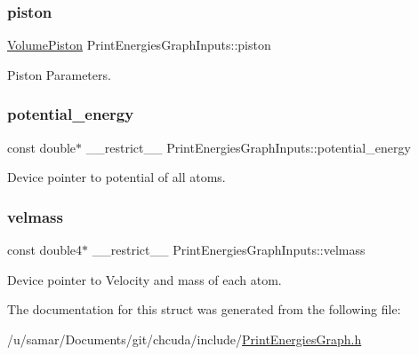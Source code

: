 \hypertarget{structPrintEnergiesGraphInputs_a37b64e2334e0ee6481ecb96081417f2a}{}\label{structPrintEnergiesGraphInputs_a37b64e2334e0ee6481ecb96081417f2a} 
\subsubsection{\texorpdfstring{piston}{piston}}
{\footnotesize\ttfamily \hyperlink{structVolumePiston}{Volume\+Piston} Print\+Energies\+Graph\+Inputs\+::piston}



Piston Parameters. 

\hypertarget{structPrintEnergiesGraphInputs_a6faa1be5d040282aca80b029942ab2eb}{}\label{structPrintEnergiesGraphInputs_a6faa1be5d040282aca80b029942ab2eb} 
\subsubsection{\texorpdfstring{potential\+\_\+energy}{potential\_energy}}
{\footnotesize\ttfamily const double$\ast$ \+\_\+\+\_\+restrict\+\_\+\+\_\+ Print\+Energies\+Graph\+Inputs\+::potential\+\_\+energy}



Device pointer to potential of all atoms. 

\hypertarget{structPrintEnergiesGraphInputs_adc38d3e47b0b4ab22dfb7b0253ccefff}{}\label{structPrintEnergiesGraphInputs_adc38d3e47b0b4ab22dfb7b0253ccefff} 
\subsubsection{\texorpdfstring{velmass}{velmass}}
{\footnotesize\ttfamily const double4$\ast$ \+\_\+\+\_\+restrict\+\_\+\+\_\+ Print\+Energies\+Graph\+Inputs\+::velmass}



Device pointer to Velocity and mass of each atom. 



The documentation for this struct was generated from the following file\+:\begin{DoxyCompactItemize}
\item 
/u/samar/\+Documents/git/chcuda/include/\hyperlink{PrintEnergiesGraph_8h}{Print\+Energies\+Graph.\+h}\end{DoxyCompactItemize}
